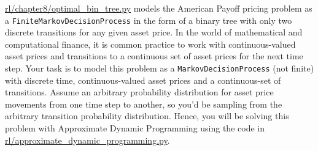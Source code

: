 \documentclass[12pt]{exam}
\begin{document}
\begin{questions}
 \href{https://github.com/TikhonJelvis/RL-book/blob/master/rl/chapter8/optimal_exercise_bin_tree.py}{rl\//chapter8\//optimal\_bin\_tree.py} models the American Payoff pricing problem as a \lstinline{FiniteMarkovDecisionProcess} in the form of a binary tree with only two discrete transitions for any given asset price. In the world of mathematical and computational finance, it is common practice to work with continuous-valued asset prices and transitions to a continuous set of asset prices for the next time step. Your task is to model this problem as a \lstinline{MarkovDecisionProcess} (not finite) with discrete time, continuous-valued asset prices and a continuous-set of transitions. Assume an arbitrary probability distribution for asset price movements from one time step to another, so you'd be sampling from the arbitrary transition probability distribution. Hence, you will be solving this problem with Approximate Dynamic Programming using the code in \href{https://github.com/TikhonJelvis/RL-book/blob/master/rl/approximate_dynamic_programming.py}{rl\//approximate\_dynamic\_programming.py}.

\end{questions}
\end{document}
